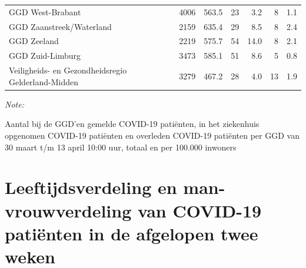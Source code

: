 \documentclass[
  english,
  man,floatsintext]{apa6}
\begin{document}
\begin{table}
\begin{threeparttable}
\begin{tabular}{lrrrrrr}
GGD West-Brabant & 4006 & 563.5 & 23 & 3.2 & 8 & 1.1\\
GGD Zaanstreek/Waterland & 2159 & 635.4 & 29 & 8.5 & 8 & 2.4\\
GGD Zeeland & 2219 & 575.7 & 54 & 14.0 & 8 & 2.1\\
GGD Zuid-Limburg & 3473 & 585.1 & 51 & 8.6 & 5 & 0.8\\
Veiligheids- en Gezondheidsregio Gelderland-Midden & 3279 & 467.2 & 28 & 4.0 & 13 & 1.9\\
\bottomrule
\end{tabular}
\begin{tablenotes}
\item \textit{Note: } 
\item Aantal bij de GGD’en gemelde COVID-19 patiënten, in het ziekenhuis opgenomen COVID-19 patiënten en overleden COVID-19 patiënten per GGD van 30 maart t/m 13 april 10:00 uur, totaal en per 100.000 inwoners
\end{tablenotes}
\end{threeparttable}
\endgroup{}
\end{table}

\newpage

\hypertarget{leeftijdsverdeling-en-man-vrouwverdeling-van-covid-19-patiuxebnten-in-de-afgelopen-twee-weken}{%
\section{Leeftijdsverdeling en man-vrouwverdeling van COVID-19 patiënten in de afgelopen twee weken}\label{leeftijdsverdeling-en-man-vrouwverdeling-van-covid-19-patiuxebnten-in-de-afgelopen-twee-weken}}
\end{document}
